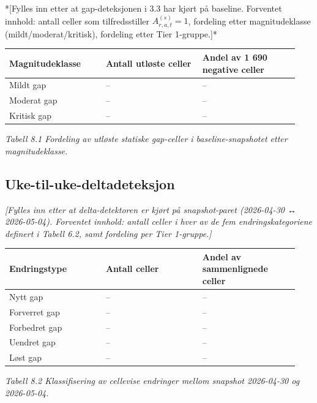 \documentclass[a4paper,11pt]{article}
\begin{document}
*[Fylles inn etter at gap-deteksjonen i 3.3 har kjørt på baseline. Forventet innhold: antall celler som tilfredsstiller $A_{r,a,t}^{(s)} = 1$, fordeling etter magnitudeklasse (mildt/moderat/kritisk), fordeling etter Tier 1-gruppe.]*

\begin{longtable}{|>{\RaggedRight}p{0.313\linewidth}|>{\RaggedRight}p{0.313\linewidth}|>{\RaggedRight}p{0.313\linewidth}|}
\hline
\textbf{Magnitudeklasse} & \textbf{Antall utløste celler} & \textbf{Andel av 1 690 negative celler} \\
\hline
\endhead
Mildt gap & – & – \\
\hline
Moderat gap & – & – \\
\hline
Kritisk gap & – & – \\
\hline
\end{longtable}

\begin{center}\small\textit{Tabell 8.1 Fordeling av utløste statiske gap-celler i baseline-snapshotet etter magnitudeklasse.}\end{center}

\subsection{Uke-til-uke-deltadeteksjon}

\textit{[Fylles inn etter at delta-detektoren er kjørt på snapshot-paret (2026-04-30 ↔ 2026-05-04). Forventet innhold: antall celler i hver av de fem endringskategoriene definert i Tabell 6.2, samt fordeling per Tier 1-gruppe.]}

\begin{longtable}{|>{\RaggedRight}p{0.313\linewidth}|>{\RaggedRight}p{0.313\linewidth}|>{\RaggedRight}p{0.313\linewidth}|}
\hline
\textbf{Endringstype} & \textbf{Antall celler} & \textbf{Andel av sammenlignede celler} \\
\hline
\endhead
Nytt gap & – & – \\
\hline
Forverret gap & – & – \\
\hline
Forbedret gap & – & – \\
\hline
Uendret gap & – & – \\
\hline
Løst gap & – & – \\
\hline
\end{longtable}

\begin{center}\small\textit{Tabell 8.2 Klassifisering av cellevise endringer mellom snapshot 2026-04-30 og 2026-05-04.}\end{center}
\end{document}
